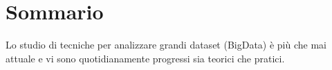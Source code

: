 \begingroup
\let\clearpage\relax
\let\cleardoublepage\relax
\let\cleardoublepage\relax

\chapter*{Sommario}

Lo studio di tecniche per analizzare grandi dataset (BigData) è più che mai attuale e vi sono quotidianamente progressi sia teorici che pratici.

\vfill

\endgroup

\vfill
